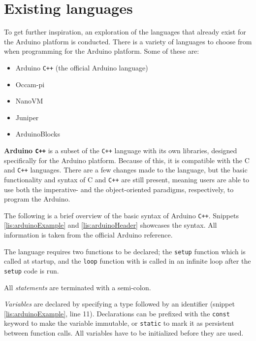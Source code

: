 \section{Existing languages}
To get further inspiration, an exploration of the languages that already exist for the Arduino platform is conducted.
There is a variety of languages to choose from when programming for the Arduino platform.
Some of these are:

\begin{itemize}
	\item Arduino \texttt{C++} (the official Arduino language)
	\item Occam-pi
	\item NanoVM
	\item Juniper
	\item ArduinoBlocks
\end{itemize}

\label{arduinoC}
\textbf{Arduino \texttt{C++}} is a subset of the \texttt{C++} language with its own libraries, designed specifically for the Arduino platform.
Because of this, it is compatible with the C and \texttt{C++} languages.
There are a few changes made to the language, but the basic functionality and syntax of C and \texttt{C++} are still present, meaning users are able to use both the imperative- and the object-oriented paradigms, respectively, to program the Arduino.

The following is a brief overview of the basic syntax of Arduino \texttt{C++}.
Snippets \ref{lis:arduinoExample} and \ref{lis:arduinoHeader} showcases the syntax.
All information is taken from the official Arduino reference\cite{ArduinoReference}.

The language requires two functions to be declared;
the \texttt{setup} function which is called at startup,
and the \texttt{loop} function with is called in an infinite loop after the \texttt{setup} code is run.

All \textit{statements} are terminated with a semi-colon.

\textit{Variables} are declared by specifying a type followed by an identifier (snippet \ref{lis:arduinoExample}, line 11).
Declarations can be prefixed with the \texttt{const} keyword to make the variable immutable, or \texttt{static} to mark it as persistent between function calls.
All variables have to be initialized before they are used. 

